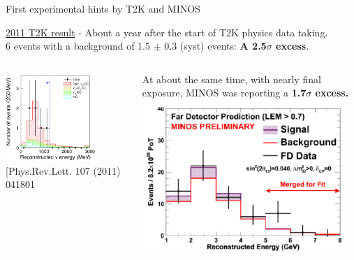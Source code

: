 \begin{frame}{First experimental hints by T2K and MINOS}

  \underline{2011 T2K result} - About a year after the start of T2K physics data taking.\\
  6 events with a background of 1.5 $\pm$ 0.3 (syst) events:
  {\bf A 2.5$\sigma$ excess}. \\

  \begin{columns}
    \begin{column}{0.60\textwidth}
      \begin{center}
       \includegraphics[width=0.75\textwidth]{./images/3nu/accelerator/t2knueapp_first}\\
       \vspace{0.3cm}
       {\scriptsize \color{blue}[Phys.Rev.Lett. 107 (2011) 041801}
      \end{center}
    \end{column}
    \begin{column}{0.40\textwidth}
         \vspace{0.3cm}
         \begin{center}
         At about the same time, with nearly final exposure,
         MINOS was reporting a {\bf 1.7$\sigma$ excess.}\\
         \includegraphics[width=0.95\textwidth]{./images/3nu/accelerator/minos_nueapp}\\

\end{center}
\end{column}
\end{columns}
\end{frame}
